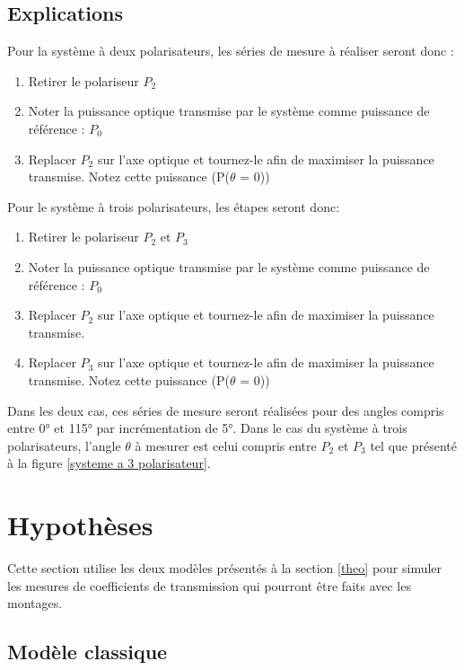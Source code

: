 \documentclass[11pt,letterpaper]{article}
\begin{document}
\subsection{Explications}

Pour la système à deux polarisateurs, les séries de mesure à réaliser seront donc :

\begin{enumerate}
    \item Retirer le polariseur $P_2$
    \item Noter la puissance optique transmise par le système comme puissance de référence : $P_0$
    \item Replacer $P_2$ sur l’axe optique et tournez-le afin de maximiser la puissance transmise. Notez cette puissance (P($\theta$ = 0))
\end{enumerate}

Pour le système à trois polarisateurs, les étapes seront donc: 

\begin{enumerate}
    \item Retirer le polariseur $P_2$ et $P_3$
    \item Noter la puissance optique transmise par le système comme puissance de référence : $P_0$
    \item Replacer $P_2$ sur l’axe optique et tournez-le afin de maximiser la puissance transmise.
    \item Replacer $P_3$ sur l’axe optique et tournez-le afin de maximiser la puissance transmise. Notez cette puissance (P($\theta$ = 0))
\end{enumerate}

Dans les deux cas, ces séries de mesure seront réalisées pour des angles compris entre 0° et 115° par incrémentation de 5°. Dans le cas du système à trois polarisateurs, l'angle $\theta$ à mesurer est celui compris entre $P_2$ et $P_3$ tel que présenté à la figure \ref{systeme a 3 polarisateur}.

\section{Hypothèses}

Cette section utilise les deux modèles présentés à la section \ref{theo} pour simuler les mesures de
coefficients de transmission qui pourront être faits avec les montages.

\subsection{Modèle classique}
\end{document}
